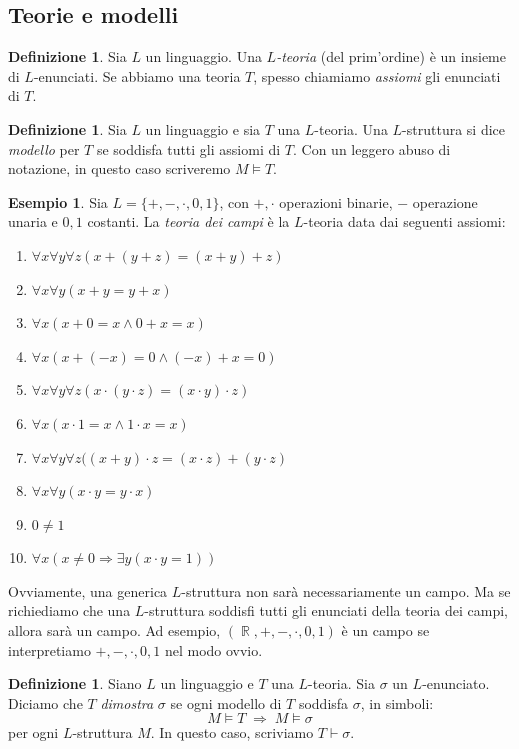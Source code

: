 \documentclass[12pt,a4paper]{report}
\theoremstyle{definition}
\newtheorem{defn}[teo]{Definizione}  %
\newtheorem{es}[teo]{Esempio}  %
\theoremstyle{num.custom-title}
\DeclareMathOperator{\R}{\mathbb{R}}
\DeclareMathOperator{\imp}{\Rightarrow}
\begin{document}
\subsection{Teorie e modelli}

\begin{defn}
Sia $L$ un linguaggio. Una $L$\emph{-teoria} (del prim'ordine) è un insieme di $L$-enunciati. Se abbiamo una teoria $T$, spesso chiamiamo \emph{assiomi} gli enunciati di $T$.
\end{defn}

\begin{defn}
Sia $L$ un linguaggio e sia $T$ una $L$-teoria. Una $L$-struttura si dice \emph{modello} per $T$ se soddisfa tutti gli assiomi di $T$. Con un leggero abuso di notazione, in questo caso scriveremo $M \models T$.
\end{defn}

\begin{es}
Sia $L=\{+,-,\cdot,0,1\}$, con $+,\cdot$ operazioni binarie, $-$ operazione unaria e $0,1$ costanti. La \emph{teoria dei campi} è la $L$-teoria data dai seguenti assiomi:
\begin{enumerate}
\item $\forall x \forall y \forall z (x + (y + z)=(x + y) + z)$
\item $\forall x \forall y (x+y=y+x)$
\item $\forall x (x + 0= x \wedge 0 + x = x)$
\item $\forall x (x + (-x) =0 \wedge (-x) + x =0)$
\item $\forall x \forall y \forall z (x \cdot (y \cdot z)=(x \cdot y) \cdot z)$
\item $\forall x (x \cdot 1= x \wedge 1 \cdot x = x)$
\item $\forall x \forall y \forall z ((x+y) \cdot z = (x \cdot z) + (y \cdot z)$
\item $\forall x \forall y (x \cdot y = y \cdot x)$
\item $0 \neq 1$
\item $\forall x (x \neq 0 \imp \exists y (x \cdot y =1))$
\end{enumerate}
Ovviamente, una generica $L$-struttura non sarà necessariamente un campo. Ma se richiediamo che una $L$-struttura soddisfi tutti gli enunciati della teoria dei campi, allora sarà un campo. Ad esempio, $(\R,+,-,\cdot,0,1)$ è un campo se interpretiamo $+,-,\cdot,0,1$ nel modo ovvio.
\end{es}

\begin{defn}
Siano $L$ un linguaggio e $T$ una $L$-teoria. Sia $\sigma$ un $L$-enunciato. Diciamo che $T$ \emph{dimostra} $\sigma$ se ogni modello di $T$ soddisfa $\sigma$, in simboli:
\[
M \models T \; \imp \; M \models \sigma
\]
per ogni $L$-struttura $M$. In questo caso, scriviamo $T \vdash \sigma$.
\end{defn}
\end{document}
